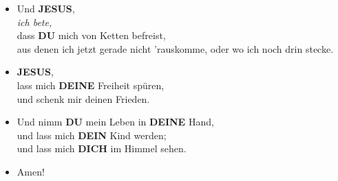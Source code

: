 \documentclass[12pt,a5paper]{article}
\newcommand{\Deine}[0]{\textbf{DEINE}}
\newcommand{\Dein}[0]{\textbf{DEIN}}
\newcommand{\Dich}[0]{\textbf{DICH}}
\newcommand{\Dir}[0]{\textbf{DIR}}
\newcommand{\Du}[0]{\textbf{DU}}
\newcommand{\Jesus}[0]{\textbf{JESUS}}
\begin{document}
\begin{itemize}[nosep]
			\\		dass {\Du} mein Leben wieder in Ordnung bringst,
			\\		und mir wieder Lebensfreude gibst,
			\\		und Freude die von {\Dir} kommt,
			\\		lebendiges Wasser in mir,
			\\		das von {\Dir} kommt.
			\item	Und {\Jesus},
			\\		\textit{ich bete,}
			\\		dass {\Du} mich von Ketten befreist,
			\\		aus denen ich jetzt gerade nicht 'rauskomme,
					oder wo ich noch drin stecke.
			\item	{\Jesus},
			\\		lass mich {\Deine} Freiheit spüren,
			\\		und schenk mir deinen Frieden.
			\item	Und nimm {\Du} mein Leben in {\Deine} Hand,
			\\		und lass mich {\Dein} Kind werden;
			\\		und lass mich {\Dich} im Himmel sehen.
			\item	Amen!
		\end{itemize}
\end{document}
